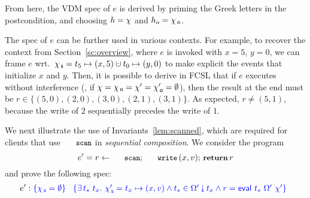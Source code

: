 From here, the VDM spec of $e$ is derived by priming the Greek letters
in the postcondition, and choosing $h = \chi$ and $h_o = \chi_{\, \mathsf{o}}$.

The spec of $e$ can be further used in various contexts. For example,
to recover the context from Section~\ref{sc:overview}, where $e$ is
invoked with $x = 5$, $y = 0$, we can frame $e$ wrt.~$\histS = t_5
\hpts (x, 5) \hunion t_0 \hpts (y, 0)$ to make explicit the events
that initialize $x$ and $y$. Then, 
%
%
it is possible to derive in FCSL that if $e$ executes without
interference (\ie, if $\chi = \chi_{\, \mathsf{o}} = \chi' = \chi_{\, \mathsf{o}}' = \emptyset$),
then the result at the end must be $r \in \{(5,0), (2,0), (3,0),
(2,1), (3,1)\}$. As expected, $r \neq (5, 1)$, because the write of
$2$ sequentially precedes the write of $1$.

We next illustrate the use of Invariants~\ref{lem:scanned}, which are
required for clients that use $\esc{scan}$ in \emph{sequential
  composition}. We consider the program
%
\[
e' = r \tbnd \esc{scan} ;\, \esc{write}\, (x,v);\, {\small{\kw{return}}}\, r 
\]
%
and prove the following spec:
{\small
\[
e' : \tsPre{\{ \histS = \hempty \}} \
\begin{array}[t]{l}
     \tsPos{\{ \exists\, t_s\ t_x\ldot\,
               \histSP = t_x \hpts (x, v) \wedge t_s \in \sideal{\stableorderP}{t_x} \wedge %
           r = \eval\ t_s\ \stableorderP\ \histP \}}
\end{array}
\]}

